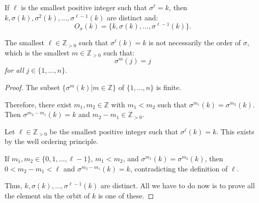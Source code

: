 \begin{itemize}
\begin{proposition}
        If $\ell$ is the smallest positive integer such that $\sigma^{\ell}=k$, then $k,\sigma(k),\sigma^2(k),\dots,\sigma^{\ell-1}(k)$ are distinct and:
        \begin{equation}
            O_{\sigma}(k) = \{k,\sigma(k),\dots,\sigma^{\ell-1}(k)\}.
        \end{equation}
    \end{proposition}
    \begin{warning}
        The smallest $\ell \in \mathbb{Z}_{>0}$ such that $\sigma^\ell(k)=k$ is not necessarily the order of $\sigma$, which is the smallest $m\in \mathbb{Z}_{>0}$ such that:
        \begin{equation}
            \sigma^{m}(j) = j
        \end{equation}
        \textit{for all} $j\in \{1,\dots,n\}$.
    \end{warning}
    \begin{proof}
        The subset $\{\sigma^m(k) | m\in \mathbb{Z}\}$ of $\{1,\dots,n\}$ is finite.

        Therefore, there exist $m_1,m_2 \in \mathbb{Z}$ with $m_1 < m_2$ such that $\sigma^{m_1}(k)=\sigma^{m_2}(k)$. Then $\sigma^{m_2-m_1}(k)=k$ and $m_2-m_1 \in \mathbb{Z}_{>0}$.
        \vspace{2mm}

        Let $\ell \in \mathbb{Z}_{>0}$ be the smallest positive integer such that $\sigma^{\ell}(k)=k$. This exists by the well ordering principle.

        If $m_1,m_2\in \{0,1,\dots,\ell-1\}$, $m_1<m_2$, and $\sigma^{m_1}(k) = \sigma^{m_2}(k)$, then $0<m_2-m_1<\ell$ and $\sigma^{m_2-m_1}(k)=k$, contradicting the definition of $\ell$.

        Thus, $k, \sigma(k), \dots, \sigma^{\ell-1}(k)$ are distinct. All we have to do now is to prove all the element sin the orbit of $k$ is one of these.


\end{proof}
\end{itemize}
